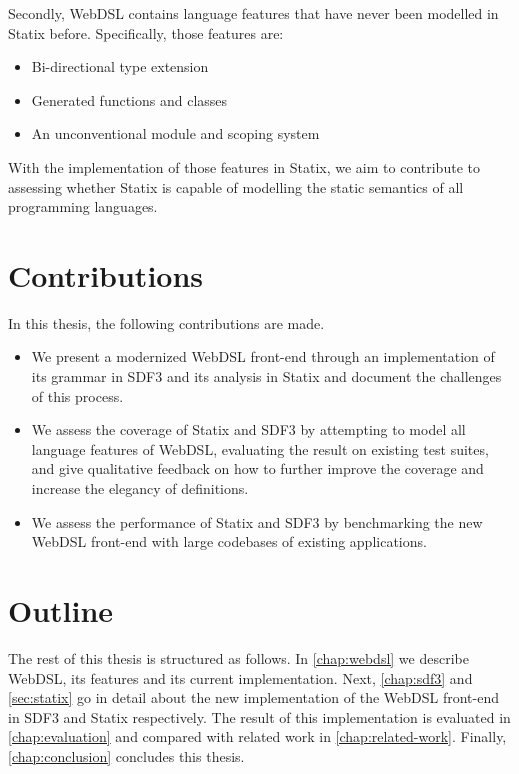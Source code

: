     Secondly, WebDSL contains language features that have never been modelled in Statix before. Specifically, those features are:

    \begin{itemize}
      \item Bi-directional type extension
      \item Generated functions and classes
      \item An unconventional module and scoping system
    \end{itemize}

    With the implementation of those features in Statix, we aim to contribute to assessing whether Statix is capable of modelling the static semantics of all programming languages.

  \section{\label{sec:contributions}Contributions}

    In this thesis, the following contributions are made.

    \begin{itemize}
      \item We present a modernized WebDSL front-end through an implementation of its grammar in SDF3 and its analysis in Statix and document the challenges of this process.
      \item We assess the coverage of Statix and SDF3 by attempting to model all language features of WebDSL, evaluating the result on existing test suites, and give qualitative feedback on how to further improve the coverage and increase the elegancy of definitions.
      \item We assess the performance of Statix and SDF3 by benchmarking the new WebDSL front-end with large codebases of existing applications.
    \end{itemize}

  \section{\label{sec:outline}Outline}
    The rest of this thesis is structured as follows. In \cref{chap:webdsl} we describe WebDSL, its features and its current implementation. Next, \cref{chap:sdf3} and \cref{sec:statix} go in detail about the new implementation of the WebDSL front-end in SDF3 and Statix respectively. The result of this implementation is evaluated in \cref{chap:evaluation} and compared with related work in \cref{chap:related-work}. Finally, \cref{chap:conclusion} concludes this thesis.

